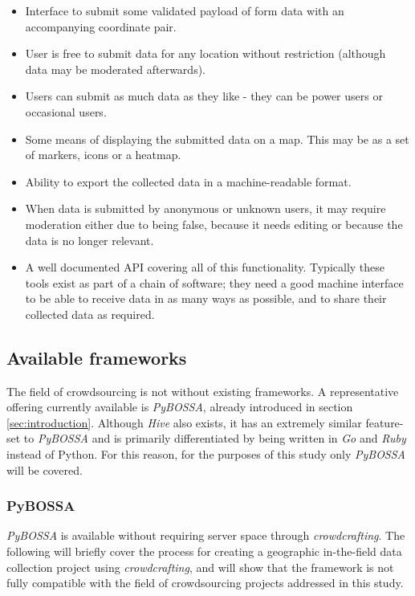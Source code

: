 \documentclass{article}
\begin{document}
		\begin{itemize}
			\item Interface to submit some validated payload of form data with an accompanying coordinate pair.
			\item User is free to submit data for any location without restriction (although data may be moderated afterwards).
			\item Users can submit as much data as they like - they can be power users or occasional users.
			\item Some means of displaying the submitted data on a map. This may be as a set of markers, icons or a heatmap.
			\item Ability to export the collected data in a machine-readable format.
			\item When data is submitted by anonymous or unknown users, it may require moderation either due to being false, because it needs editing or because the data is no longer relevant.
			\item A well documented API covering all of this functionality. Typically these tools exist as part of a chain of software; they need a good machine interface to be able to receive data in as many ways as possible, and to share their collected data as required.
		\end{itemize}

		\subsection{Available frameworks}

		The field of crowdsourcing is not without existing frameworks. A representative offering currently available is \emph{PyBOSSA}, already introduced in section \ref{sec:introduction}. Although \emph{Hive} also exists, it has an extremely similar feature-set to \emph{PyBOSSA} and is primarily differentiated by being written in \emph{Go} and \emph{Ruby}\cite{_nytlabs/hive_????} instead of Python. For this reason, for the purposes of this study only \emph{PyBOSSA} will be covered.

		\subsubsection{PyBOSSA}

		\emph{PyBOSSA} is available without requiring server space through \emph{crowdcrafting}. The following will briefly cover the process for creating a geographic in-the-field data collection project using \emph{crowdcrafting}, and will show that the framework is not fully compatible with the field of crowdsourcing projects addressed in this study.
\end{document}
